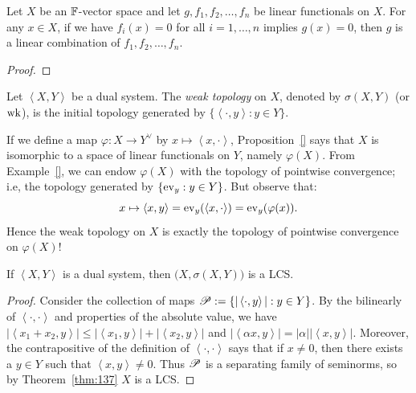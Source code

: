 \begin{corollary}\label{cor:lin-funct-rel}
	Let $X$ be an $\mathbb{F}$-vector space and let $g, f_1,f_2,\ldots ,f_n$ be linear functionals on $X$. For any $x \in X$, if we have $f_i(x) = 0$ for all $i = 1,\ldots ,n$ implies $g(x) = 0$, then $g$ is a linear combination of $f_1,f_2,\ldots ,f_n$.
\end{corollary}
	{\color{red}
	\begin{proof}
			
	\end{proof}}

\begin{definition}
	Let $\left<X,Y \right>$ be a dual system. The \emph{weak topology} on $X$, denoted by $\sigma(X,Y)$ (or $\operatorname{wk}$), is the initial topology generated by $\{\left<\cdot,y \right> : y \in Y\}$.
\end{definition}

\begin{remark}
	If we define a map $\varphi:X \rightarrow Y^\vee$ by $x \mapsto \left<x,\cdot \right>$, Proposition~\ref{} says that $X$ is isomorphic to a space of linear functionals on $Y$, namely $\varphi(X)$. From Example~\ref{}, we can endow $\varphi(X)$ with the topology of pointwise convergence; i.e, the topology generated by $\{\operatorname{ev}_y : y \in Y\}$. But observe that:
	\[
		x \mapsto \left<x,y \right> = \operatorname{ev}_y(\left<x,\cdot \right>) = \operatorname{ev}_y(\varphi(x)).
	\]
	Hence the weak topology on $X$ is exactly the topology of pointwise convergence on $\varphi(X)$!
\end{remark}

\begin{proposition}\label{prop:dual-is-lcs}
	If $\left<X,Y \right>$ is a dual system, then $\bigl( X,\sigma(X,Y) \bigr)$ is a LCS.
\end{proposition}
	\begin{proof}
		Consider the collection of maps $ \mathscr{P} := \{|\left<\cdot,y \right>| : y \in Y\}$. By the bilinearly of $\left<\cdot,\cdot \right>$ and properties of the absolute value, we have $|\left<x_1 + x_2, y \right>| \leq |\left<x_1,y \right>| + |\left<x_2,y \right>|$ and $|\left<\alpha x,y \right>| = |\alpha| |\left<x,y \right>|$. Moreover, the contrapositive of the definition of $\left<\cdot,\cdot \right>$ says that if $x \neq 0$, then there exists a $y \in Y$ such that $\left<x,y \right> \neq 0$. Thus $\mathscr{P}$ is a separating family of seminorms, so by Theorem~\ref{thm:137} $X$ is a LCS.
	\end{proof}

